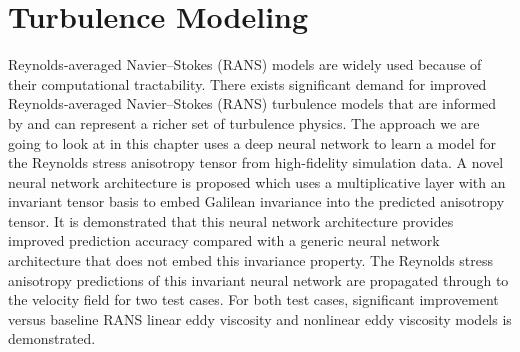 \documentclass[book.tex]{subfiles}
\begin{document}
\section{Turbulence Modeling}
Reynolds-averaged Navier–Stokes (RANS) models are widely used because of
their computational tractability. There exists significant demand for improved Reynolds-averaged Navier–Stokes
(RANS) turbulence models that are informed by and can represent a richer set of
turbulence physics. The approach we are going to look at in this chapter uses a deep neural network to
learn a model for the Reynolds stress anisotropy tensor from high-fidelity simulation
data. A novel neural network architecture is proposed which uses a multiplicative
layer with an invariant tensor basis to embed Galilean invariance into the predicted
anisotropy tensor. It is demonstrated that this neural network architecture provides
improved prediction accuracy compared with a generic neural network architecture that
does not embed this invariance property. The Reynolds stress anisotropy predictions
of this invariant neural network are propagated through to the velocity field for two
test cases. For both test cases, significant improvement versus baseline RANS linear
eddy viscosity and nonlinear eddy viscosity models is demonstrated.





\end{document}
